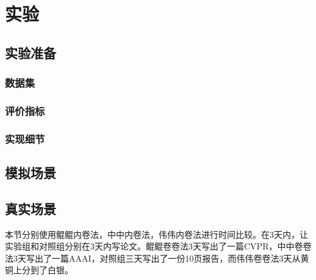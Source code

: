 \section{实验}\label{numerical experiments}

\subsection{实验准备}
\subsubsection{数据集}
\cite{KITTI}
\cite{SemanticKITTI}
\subsubsection{评价指标}
\subsubsection{实现细节}
\subsection{模拟场景}
\subsection{真实场景}

本节分别使用鲲鲲内卷法，中中内卷法，伟伟内卷法进行时间比较。在3天内，让实验组和对照组分别在3天内写论文。鲲鲲卷卷法3天写出了一篇CVPR，中中卷卷法3天写出了一篇AAAI，对照组三天写出了一份10页报告，而伟伟卷卷法3天从黄铜上分到了白银。

